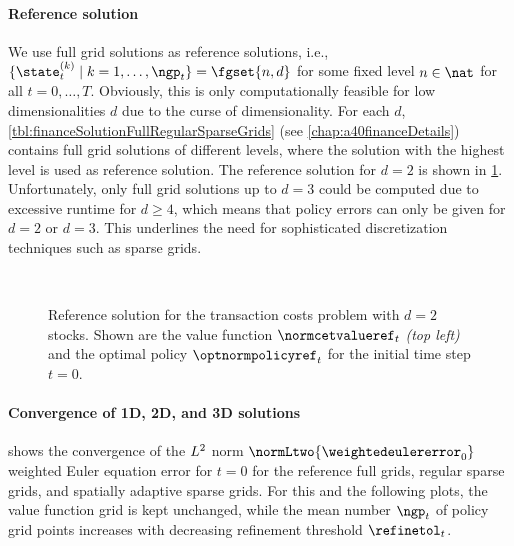 \paragraph{Reference solution}

We use full grid solutions as reference solutions,
i.e., $\{\state_t^{(k)} \mid k = 1, \dotsc, \ngp_t\} = \fgset{n,d}$
for some fixed level $n \in \nat$ for all $t = 0, \dotsc, T$.
Obviously, this is only computationally feasible
for low dimensionalities $d$ due to the curse of dimensionality.
For each $d$,
\cref{tbl:financeSolutionFullRegularSparseGrids}
(see \cref{chap:a40financeDetails})
contains full grid solutions of different levels,
where the solution with the highest level is used as reference solution.
The reference solution for $d = 2$ is shown in
\cref{fig:financeSolution2DReference}.
Unfortunately, only full grid solutions up to $d = 3$ could be computed
due to excessive runtime for $d \ge 4$,
which means that policy errors can only be given for $d = 2$ or $d = 3$.
This underlines the need for sophisticated
discretization techniques such as sparse grids.

\begin{figure}
  \hfill%
  \hfill%
  \\[1mm]%
  \hfill%
  \hfill%
  \caption[Reference solution for the two-dimensional TCP]{%
    Reference solution for the transaction costs problem
    with $d = 2$ stocks.
    Shown are the value function $\normcetvalueref_t$ \emph{(top left)} and the
    optimal policy $\optnormpolicyref_t$ for the initial time step $t = 0$.%
  }%
  \label{fig:financeSolution2DReference}%
\end{figure}

\paragraph{Convergence of 1D, 2D, and 3D solutions}


 shows the convergence of the
$L^2$ norm $\normLtwo{\weightedeulererror_0}$
weighted Euler equation error for $t = 0$ for the reference full grids,
regular sparse grids, and spatially adaptive sparse grids.
For this and the following plots,
the value function grid is kept unchanged,
while the mean number $\ngp_t$ of policy grid points increases
with decreasing refinement threshold $\refinetol_t$.


